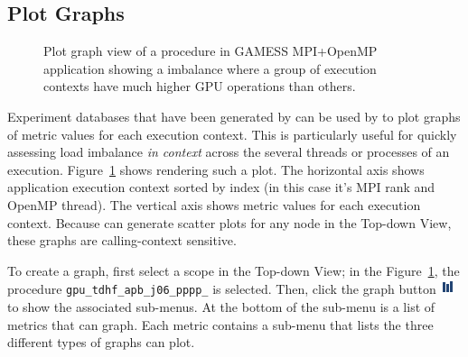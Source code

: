 \subsection{Plot Graphs}
\label{sec:hpcviewer:plots}
\begin{figure}[t]
\caption{Plot graph view of a procedure in GAMESS MPI+OpenMP application showing a imbalance where a group of execution contexts have much higher GPU operations than others.}
\label{fig:hpcviewer-view-scatterplot}
\end{figure}

\HPCToolkit{} Experiment databases that have been generated by \hpcprof{} can be used by \hpcviewer{} to plot graphs of metric values for each execution context.
This is particularly useful for quickly assessing load imbalance \emph{in context} across the several threads or processes of an execution.
Figure~\ref{fig:hpcviewer-view-scatterplot} shows \hpcviewer{} rendering such a plot.
The horizontal axis shows application execution context sorted by index (in this case it's MPI rank and OpenMP thread).
The vertical axis shows metric values for each execution context.
Because \hpcviewer{} can generate scatter plots for any node in the Top-down View, these graphs are calling-context sensitive.

To create a graph, first select a scope in the Top-down View; in the Figure~\ref{fig:hpcviewer-view-scatterplot}, the procedure \texttt{gpu\_tdhf\_apb\_j06\_pppp\_} is selected.
Then, click the graph button \includegraphics[scale=.8]{fig/hpcviewer-button-graph.png} to show the associated sub-menus.
At the bottom of the sub-menu is a list of metrics that \hpcviewer{} can graph.
Each metric contains a sub-menu that lists the three different types of graphs \hpcviewer{} can plot.

